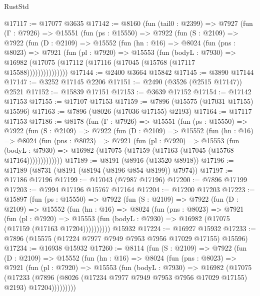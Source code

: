 \begin{lexlean}{RustStd}
\begin{coremodule}
@17117 := @17077 @3635
@17142 := @8160
    (fun (tail0 : @2399) =>
    @7927
      (fun (Γ : @7926) =>
      @15551
        (fun (ps : @15550) =>
        @7922
          (fun (S : @2109) =>
          @7922
            (fun (D : @2109) =>
            @15552
              (fun (hn : @16) =>
              @8024
                (fun (pns : @8023) =>
                @7921
                  (fun (pl : @7920) =>
                  @15553
                    (fun (bodyL : @7930) =>
                    @16982 (@17075 (@17112 (@17116 (@17045 (@15768 (@17117 @15588)))))))))))))))
@17144 := @2400 @3664 @15842
@17145 := @3890 @17144
@17147 := @3252 @17145 @2206
@17151 := @2490 (@3526 (@2515 @17147)) @2521
@17152 := @15839 @17151
@17153 := @3639 @17152
@17154 := @17142 @17153
@17155 := @17107 @17153
@17159 := @7896 (@15575 (@17031 @17155) @15596)
@17163 := @7896 (@8026 (@17036 @17155) @2193)
@17164 := @17117 @17153
@17186 := @8178
    (fun (Γ : @7926) =>
    @15551
      (fun (ps : @15550) =>
      @7922
        (fun (S : @2109) =>
        @7922
          (fun (D : @2109) =>
          @15552
            (fun (hn : @16) =>
            @8024
              (fun (pns : @8023) =>
              @7921
                (fun (pl : @7920) =>
                @15553
                  (fun (bodyL : @7930) =>
                  @16982 (@17075 (@17159 (@17163 (@17045 (@15768 @17164)))))))))))))
@17189 := @8191 (@8916 (@13520 @8918))
@17196 := @17189 (@8731 (@8191 (@8194 (@8196 @854 @8199)) @7974))
@17197 := @17186 @17196
@17199 := @17043 (@7987 @17196)
@17200 := @7896 @17199
@17203 := @7994 @17196 @15767 @17164
@17204 := @17200 @17203
@17223 := @15897
    (fun (ps : @15550) =>
    @7922
      (fun (S : @2109) =>
      @7922
        (fun (D : @2109) =>
        @15552
          (fun (hn : @16) =>
          @8024
            (fun (pns : @8023) =>
            @7921
              (fun (pl : @7920) =>
              @15553 (fun (bodyL : @7930) => @16982 (@17075 (@17159 (@17163 @17204))))))))))
    @15932
@17224 := @16927 @15932
@17233 := @7896 (@15575 (@17224 @7977 @7949 @7953 @7956 @17029 @17155) @15596)
@17234 := @16938 @15932
@17260 := @8114
    (fun (S : @2109) =>
    @7922
      (fun (D : @2109) =>
      @15552
        (fun (hn : @16) =>
        @8024
          (fun (pns : @8023) =>
          @7921
            (fun (pl : @7920) =>
            @15553
              (fun (bodyL : @7930) =>
              @16982
                (@17075
                  (@17233
                    (@7896
                      (@8026 (@17234 @7977 @7949 @7953 @7956 @17029 @17155) @2193)
                      @17204)))))))))

\end{coremodule}
\end{lexlean}
